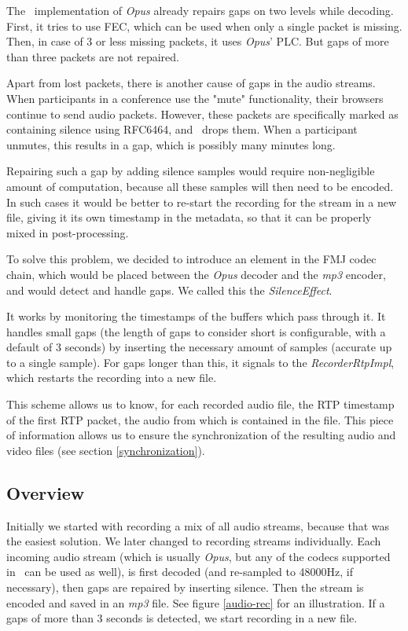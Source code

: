 \documentclass[twoside,openright,a4paper,12pt,english]{article}
\begin{document}
The \lj\ implementation of \emph{Opus} already repairs gaps on two levels while decoding.
First, it tries to use FEC, which can be used when only a single packet is
missing. Then, in case of 3 or less missing packets, it uses \emph{Opus}' PLC.
But gaps of more than three packets are not repaired.

Apart from lost packets, there is another cause of gaps in the audio streams. When
participants in a conference use the "mute" functionality, their browsers continue to send
audio packets. However, these packets are specifically marked as containing silence using
RFC6464, and \jvb\ drops them. When a participant unmutes, this results in a
gap, which is possibly many minutes long.

Repairing such a gap by adding silence samples would require non-negligible amount
of computation, because all these samples will then need to be encoded. In such cases
it would be better to re-start the
recording for the stream in a new file, giving it its own timestamp in the
metadata, so that it can be properly mixed in post-processing.

To solve this problem, we decided to introduce an element in the FMJ codec chain, which
would be placed between the \emph{Opus} decoder and the \emph{mp3} encoder, and would detect and
handle gaps. We called this the \emph{SilenceEffect}.

It works by monitoring the timestamps of the buffers which pass through it. It
handles small gaps (the length of gaps to consider short is configurable, with
a default of 3 seconds) by inserting the necessary amount of samples (accurate
up to a single sample). For gaps longer than this, it signals to the
\emph{RecorderRtpImpl}, which restarts the recording into a new file.

This scheme allows us to know, for each recorded audio file, the RTP timestamp
of the first RTP packet, the audio from which is contained in the file. This piece of
information allows us to ensure the synchronization of the resulting audio and video files (see
section \ref{synchronization}).


\subsection{Overview}
Initially we started with recording a mix of all audio streams, because that
was the easiest solution. We later changed to recording streams individually.
Each incoming audio stream (which is usually \emph{Opus}, but any of the codecs
supported in \lj\ can be used as well), is first decoded (and re-sampled to
48000Hz, if necessary), then gaps are repaired by inserting silence. Then the
stream is encoded and saved in an \emph{mp3} file. See figure \ref{audio-rec}
for an illustration. If a gaps of more than 3 seconds is detected, we start
recording in a new file.
\end{document}
